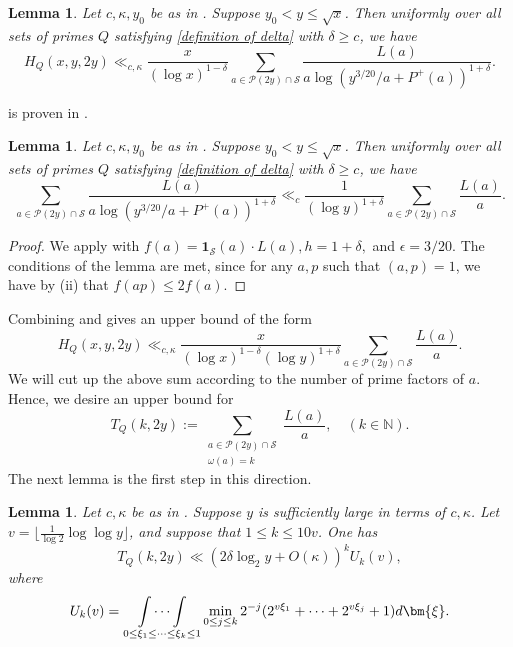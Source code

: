 \documentclass{amsart}
\newtheorem{lemma}[theorem]{Lemma}
\theoremstyle{definition}
\numberwithin{equation}{section}
\newcommand{\N}{\mathbb{N}}
\renewcommand{\S}{\mathcal{S}}
\newcommand{\density}{\delta}
\begin{document}
	
	\begin{lemma}\label{lem UB 1} Let $c,\kappa,y_{0}$ be as in . Suppose $y_0 < y \leq \sqrt{x}$. Then uniformly over all sets of primes $Q$ satisfying \eqref{definition of delta} with $\delta \ge c$, we have 
		$$H_Q(x,y,2y) \ll_{c,\kappa} \frac{x}{(\log x)^{1-\density}} \sum_{a \in \mathscr{P}(2y) \cap \S}\frac{L(a)}{a \log(y^{3/20}/a + P^+(a))^{1+\delta}}.$$
	\end{lemma}
	 is proven in .
		\begin{lemma}\label{lem UB 3} Let $c,\kappa,y_{0}$ be as in . Suppose $y_0 < y \leq \sqrt{x}$. Then uniformly over all sets of primes $Q$ satisfying \eqref{definition of delta} with $\delta \ge c$, we have 
			$$\sum_{a \in \mathscr{P}(2y) \cap \S}\frac{L(a)}{a \log(y^{3/20}/a+P^+(a) )^{1+\density}} \ll_c \frac{1}{(\log y)^{1+\density}} \sum_{a \in \mathscr{P}(2y) \cap \S}\frac{L(a)}{a}.$$
		\end{lemma}
		\begin{proof}
			We apply  with $f(a) = \bm{1}_{\S}(a) \cdot L(a), h = 1+\delta,$ and $\epsilon= 3/20.$ The conditions of the lemma are met, since for any $a,p$ such that $(a,p) = 1$, we have by  (ii) that $f(ap) \leq 2 f(a)$. 
		\end{proof}
	Combining  and  gives an upper bound of the form \begin{equation} \label{UB eq H to L}
			H_Q(x,y,2y) \ll_{c,\kappa} \frac{x}{(\log x)^{1-\density}(\log y)^{1+\density}} \sum_{a \in \mathscr{P}(2y) \cap \S} \frac{L(a)}{a}.
		\end{equation}
		We will cut up the above sum according to the number of prime factors of $a$. Hence, we desire an upper bound for
		$$T_Q(k,2y) := \sum_{\substack{a \in \mathscr{P}(2y) \cap \S \\ \omega(a) = k}} \frac{L(a)}{a}, \quad (k \in \N).$$
		The next lemma is the first step in this direction.
		\begin{lemma} \label{lem UB 4}
			Let $c,\kappa$ be as in . Suppose $y$ is sufficiently large in terms of $c,\kappa$. Let $v = \lfloor\frac{1}{\log 2}\log \log y\rfloor$, and suppose that $1 \leq k \leq 10v$. One has
			$$T_Q(k,2y) \ll (2 \density \log_2 y + O(\kappa))^k U_k(v),$$
			where 
			\begin{equation}\label{def Uk}
			U_k(v) = \underset{{0 \leq \xi_1 \leq \cdots \leq \xi_k \leq 1}}{\idotsint} \min_{0 \leq j \leq k} 2^{-j}(2^{v \xi_1} + \cdots + 2^{v \xi_j} +1)d\bm{\xi}.	
			\end{equation} 
		\end{lemma}
\end{document}
